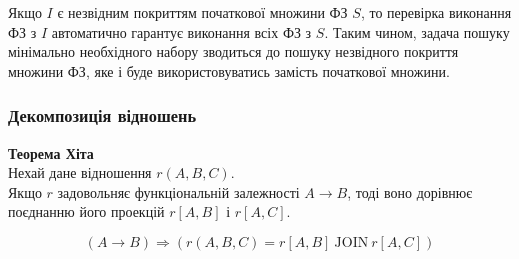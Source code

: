 Якщо $I$ є незвідним покриттям початкової множини ФЗ $S$, то перевірка виконання ФЗ з $I$ автоматично гарантує виконання всіх ФЗ з $S$. Таким чином, задача пошуку мінімально необхідного набору зводиться до пошуку незвідного покриття множини ФЗ, яке і буде використовуватись замість початкової множини.

\subsubsection{Декомпозиція відношень}

\textbf{Теорема Хіта} \\

Нехай дане відношення $r\left(A,B,C\right)$. \\

Якщо $r$ задовольняє функціональній залежності $A\to B$, тоді воно дорівнює поєднанню його проекцій $r\left[A,B\right]$ і $r\left[A,C\right]$.

\[ \left(A\to B\right)\Rightarrow \left(r\left(A,B,C\right)=r\left[A,B\right]\ {\text{JOIN}}\ r\left[A,C\right]\right) \]
